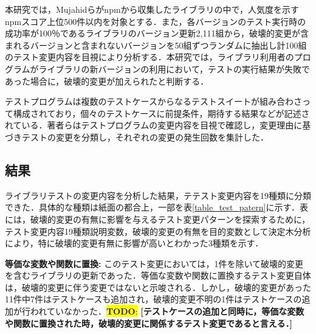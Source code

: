 \documentclass[uplatex,dvipdfmx,a4paper,twocolumn,base=11pt,jbase=11pt,ja=standard]{bxjsarticle}  %
\newcommand{\todo}[1]{\colorbox{yellow}{{\bf TODO}:}{\color{red} {\textbf{[#1]}}}}
\begin{document}
本研究では，Mujahidらがnpmから収集したライブラリの中で，人気度を示すnpmスコア上位500件以内を対象とする．また，各バージョンのテスト実行時の成功率が100％であるライブラリのバージョン更新2,111組から，破壊的変更が含まれるバージョンと含まれないバージョンを50組ずつランダムに抽出し計100組のテスト変更内容を目視により分析する．本研究では，ライブラリ利用者のプログラムがライブラリの新バージョンの利用において，テストの実行結果が失敗であった場合に，破壊的変更が加えられたと判断する．

%
%

テストプログラムは複数のテストケースからなるテストスイートが組み合わさって構成されており，個々のテストケースに前提条件，期待する結果などが記述されている．著者らはテストプログラムの変更内容を目視で確認し，変更理由に基づきテストの変更を分類し，それぞれの変更の発生回数を集計した．



\subsection{結果}

ライブラリテストの変更内容を分析した結果，テテスト変更内容を19種類に分類できた．具体的な種類は紙面の都合上，一部を表\ref{table_test_patern}に示す．表には，破壊的変更の有無に影響を与えるテスト変更パターンを探索するために，テスト変更内容19種類説明変数，破壊的変更の有無を目的変数として決定木分析により，特に破壊的変更有無に影響が高いとわかった3種類を示す．

\noindent\textbf{等価な変数や関数に置換: }このテスト変更においては，1件を除いて破壊的変更を含むライブラリの更新であった．等価な変数や関数に置換するテスト変更自体は，破壊的変更に伴う変更ではないと示唆される．しかし，破壊的変更があった11件中7件はテストケースも追加され，破壊的変更不明の1件はテストケースの追加が行われていなかった．\todo{テストケースの追加と同時に，等価な変数や関数に置換された時，破壊的変更に関係するテスト変更であると言える．}
\end{document}
